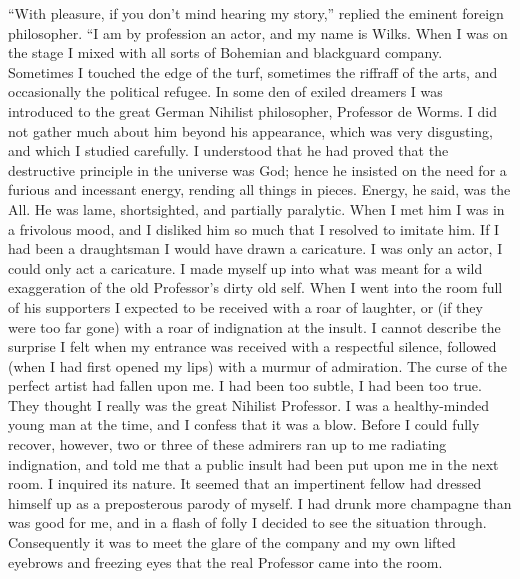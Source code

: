 “With pleasure, if you don’t mind hearing my story,” replied the eminent foreign philosopher. “I am by profession an actor, and my name is Wilks. When I was on the stage I mixed with all sorts of Bohemian and blackguard company. Sometimes I touched the edge of the turf, sometimes the riffraff of the arts, and occasionally the political refugee. In some den of exiled dreamers I was introduced to the great German Nihilist philosopher, Professor de Worms. I did not gather much about him beyond his appearance, which was very disgusting, and which I studied carefully. I understood that he had proved that the destructive principle in the universe was God; hence he insisted on the need for a furious and incessant energy, rending all things in pieces. Energy, he said, was the All. He was lame, shortsighted, and partially paralytic. When I met him I was in a frivolous mood, and I disliked him so much that I resolved to imitate him. If I had been a draughtsman I would have drawn a caricature. I was only an actor, I could only act a caricature. I made myself up into what was meant for a wild exaggeration of the old Professor’s dirty old self. When I went into the room full of his supporters I expected to be received with a roar of laughter, or (if they were too far gone) with a roar of indignation at the insult. I cannot describe the surprise I felt when my entrance was received with a respectful silence, followed (when I had first opened my lips) with a murmur of admiration. The curse of the perfect artist had fallen upon me. I had been too subtle, I had been too true. They thought I really was the great Nihilist Professor. I was a healthy-minded young man at the time, and I confess that it was a blow. Before I could fully recover, however, two or three of these admirers ran up to me radiating indignation, and told me that a public insult had been put upon me in the next room. I inquired its nature. It seemed that an impertinent fellow had dressed himself up as a preposterous parody of myself. I had drunk more champagne than was good for me, and in a flash of folly I decided to see the situation through. Consequently it was to meet the glare of the company and my own lifted eyebrows and freezing eyes that the real Professor came into the room.

